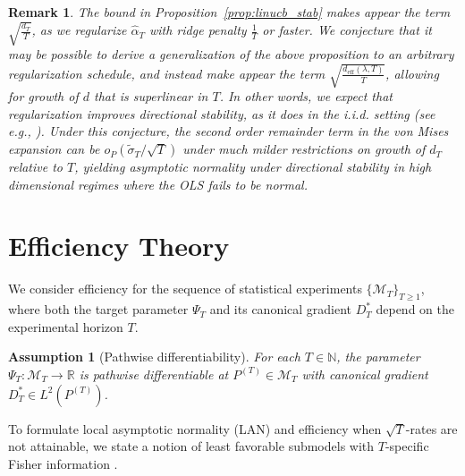 \documentclass[11pt]{article}
\newtheorem{assum}{Assumption}
\newtheorem{rem}{Remark}
\begin{document}
\begin{rem}
    The bound in Proposition~\ref{prop:linucb_stab} makes appear the term $\sqrt{\frac{d_T}{T}}$, as we regularize $\widehat{\alpha}_T$ with ridge penalty $\frac{1}{T}$ or faster. We conjecture that it may be possible to derive a generalization of the above proposition to an arbitrary regularization schedule, and instead make appear the term $\sqrt{\frac{d_{\mathrm{eff}}(\lambda, T)}{T}}$, allowing for growth of $d$ that is superlinear in $T$. In other words, we expect that regularization improves directional stability, as it does in the i.i.d. setting (see e.g., \citealp{bruns2025augmented}). Under this conjecture, the second order remainder term in the von Mises expansion can be $o_P(\widetilde{\sigma}_T/\sqrt{T})$ under much milder restrictions on growth of $d_T$ relative to $T$, yielding asymptotic normality under directional stability in high dimensional regimes where the OLS fails to be normal.   
\end{rem}



\section{Efficiency Theory}
\label{sec: efficiency_theory}

We consider efficiency for the sequence of statistical experiments
$\{\mathcal{M}_T\}_{T \ge 1}$, where both the target parameter $\Psi_T$ and its
canonical gradient $D_T^*$ depend on the experimental horizon $T$. 

\begin{assum}[Pathwise differentiability]
\label{ass: pathwise_differentiability}
    For each $T\in \mathbb{N}$, the parameter $\Psi_T : \mathcal{M}_T \to \mathbb{R}$ is pathwise differentiable at $P^{(T)} \in \mathcal{M}_T$ with canonical gradient $D^{\ast}_T \in L^2(P^{(T)})$. 
\end{assum}

To formulate local asymptotic normality (LAN) and efficiency when $\sqrt{T}$-rates are not attainable, we state a notion of least favorable submodels with $T$-specific Fisher information \citep{vanderVaart1998asymptotic}.
\end{document}
